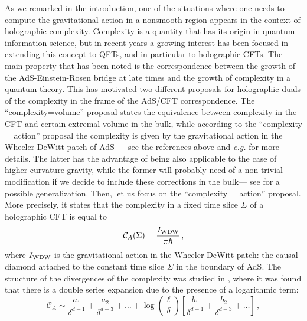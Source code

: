 \documentclass[11pt,letterpaper]{article}
\begin{document}
As we remarked in the introduction, one of the situations where one needs to compute the gravitational action in a nonsmooth region appears in the context of holographic complexity.
Complexity is a quantity that has its origin in quantum information science, but in recent years a growing interest has been focused in extending this concept to QFTs, and in particular to holographic CFTs. The main property that has been noted is the correspondence between the growth of the AdS-Einstein-Rosen bridge at late times and the growth of complexity in a quantum theory. This has motivated two different proposals for holographic duals of the complexity in the frame of the AdS/CFT correspondence. The ``complexity=volume'' proposal \cite{Susskind:2014rva,Stanford:2014jda,Susskind:2014jwa} states the equivalence between complexity in the CFT and certain extremal volume in the bulk, while according to the ``complexity = action'' proposal \cite{Brown:2015bva,Brown:2015lvg} the complexity is given by the gravitational action in the Wheeler-DeWitt patch of AdS --- see the references above and \textit{e.g.} \cite{Chapman:2016hwi,Carmi:2016wjl} for more details. The latter has the advantage of being also applicable to the case of higher-curvature gravity, while the former will probably need of a non-trivial modification if we decide to include these corrections in the bulk--- see \cite{Bueno:2016gnv} for a possible generalization. 
Then, let us focus on the ``complexity = action'' proposal. More precisely, it states that the complexity in a fixed time slice $\Sigma$ of a holographic CFT is equal to
\begin{equation}
\mathcal{C}_A(\Sigma)=\frac{I_{\rm WDW}}{\pi \hbar}\, ,
\end{equation}
where $I_{\rm WDW}$ is the gravitational action in the Wheeler-DeWitt patch: the causal diamond attached to the constant time slice $\Sigma$ in the boundary of AdS. The structure of the divergences of the complexity was studied in \cite{Carmi:2016wjl}, where it was found that there is a double series expansion due to the presence of a logarithmic term:
\begin{equation}\label{Cexp}
\mathcal{C}_A\sim\frac{a_1}{\delta^{d-1}}+\frac{a_2}{\delta^{d-3}}+\ldots+\log\left(\frac{\ell}{\delta}\right)\left[\frac{b_1}{\delta^{d-1}}+\frac{b_2}{\delta^{d-3}}+\ldots\right]\, ,
\end{equation}
\end{document}
